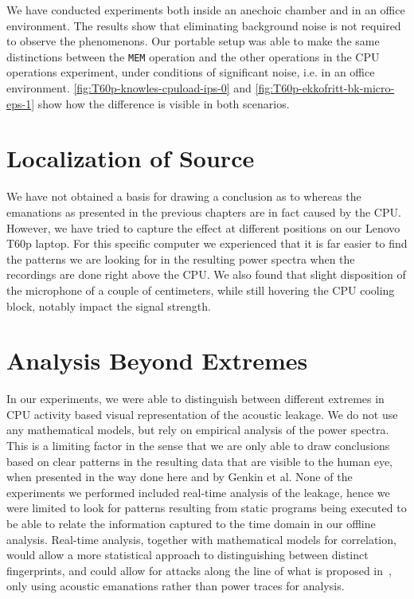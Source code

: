 We have conducted experiments both inside an anechoic chamber and in an office environment.
The results show that eliminating background noise is not required to observe the phenomenons.
Our portable setup was able to make the same distinctions between the \texttt{MEM} operation and the other operations in the CPU operations experiment, under conditions of significant noise, i.e. in an office environment.
\autoref{fig:T60p-knowles-cpuload-ips-0} and \autoref{fig:T60p-ekkofritt-bk-micro-eps-1} show how the difference is visible in both scenarios.


\section{Localization of Source}
We have not obtained a basis for drawing a conclusion as to whereas the emanations as presented in the previous chapters are in fact caused by the \gls{CPU}.
However, we have tried to capture the effect at different positions on our Lenovo T60p laptop. 
For this specific computer we experienced that it is far easier to find the patterns we are looking for in the resulting power spectra when the recordings are done right above the \gls{CPU}.
We also found that slight disposition of the microphone of a couple of centimeters, while still hovering the \gls{CPU} cooling block, notably impact the signal strength.


\section{Analysis Beyond Extremes}
In our experiments, we were able to distinguish between different extremes in \gls{CPU} activity based visual representation of the acoustic leakage. 
We do not use any mathematical models, but rely on empirical analysis of the power spectra. 
This is a limiting factor in the sense that we are only able to draw conclusions based on clear patterns in the resulting data that are visible to the human eye, when presented in the way done here and by Genkin et al.
None of the experiments we performed included real-time analysis of the leakage, hence we were limited to look for patterns resulting from static programs being executed to be able to relate the information captured to the time domain in our offline analysis.
Real-time analysis, together with mathematical models for correlation, would allow a more statistical approach to distinguishing between distinct fingerprints, and could allow for attacks along the line of what is proposed in~\cite{DBLP:conf/crypto/KocherJJ99}, only using acoustic emanations rather than power traces for analysis.


